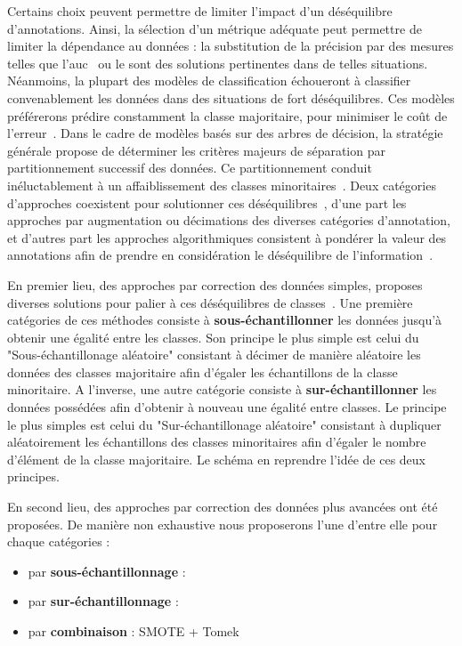 Certains choix peuvent permettre de limiter l'impact d'un déséquilibre d'annotations. Ainsi, la sélection d'un métrique adéquate peut permettre de limiter la dépendance au données : la substitution de la précision par des mesures telles que l'\gls{auc}~\cite{Celebi2007} ou le \fscore sont des solutions pertinentes dans de telles situations. Néanmoins, la plupart des modèles de classification échoueront à classifier convenablement les données dans des situations de fort déséquilibres. Ces modèles préférerons prédire constamment la classe majoritaire, pour minimiser le coût de l'erreur~\cite{Huang2013}. Dans le cadre de modèles basés sur des arbres de décision, la stratégie générale propose de déterminer les critères majeurs de séparation par partitionnement successif des données. Ce partitionnement conduit inéluctablement à un affaiblissement des classes minoritaires~\cite{He2009}. Deux catégories d'approches coexistent pour solutionner ces déséquilibres~\cite{Huang2013}, d'une part les approches par augmentation ou décimations des diverses catégories d'annotation, et d'autres part les approches algorithmiques consistent à pondérer la valeur des annotations afin de prendre en considération le déséquilibre de l'information~\cite{Ting2002,He2009,Thai2010}.\par

En premier lieu, des approches par correction des données simples, proposes diverses solutions pour palier à ces déséquilibres de classes~\cite{Prati2009, He2009}. Une première catégories de ces méthodes consiste à \textbf{sous-échantillonner} les données jusqu'à obtenir une égalité entre les classes. Son principe le plus simple est celui du "Sous-échantillonage aléatoire" consistant à décimer de manière aléatoire les données des classes majoritaire afin d'égaler les échantillons de la classe minoritaire. A l'inverse, une autre catégorie consiste à \textbf{sur-échantillonner} les données possédées afin d'obtenir à nouveau une égalité entre classes. Le principe le plus simples est celui du "Sur-échantillonage aléatoire" consistant à dupliquer aléatoirement les échantillons des classes minoritaires afin d'égaler le nombre d'élément de la classe majoritaire. Le schéma en  reprendre l'idée de ces deux principes.\par

En second lieu, des approches par correction des données plus avancées ont été proposées. De manière non exhaustive nous proposerons l'une d'entre elle pour chaque catégories :
\begin{itemize}
    \item par \textbf{sous-échantillonnage} : \cite{Tomek1976}
    \item par \textbf{sur-échantillonnage} : \cite{Chawla2002} 
    \item par \textbf{combinaison} : SMOTE + Tomek
\end{itemize}\par


